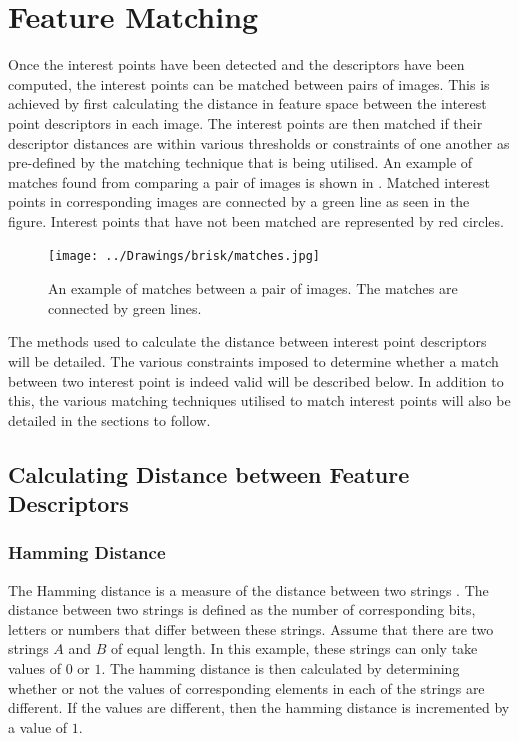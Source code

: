 \chapter{Feature Matching}
\label{sec:matching}
Once the interest points have been detected and the descriptors have been computed, the interest points can be matched between pairs of images. This is achieved by first calculating the distance in feature space between the interest point descriptors in each image. The interest points are then matched if their descriptor distances are within various thresholds or constraints of one another as pre-defined by the matching technique that is being utilised. An example of matches found from comparing a pair of images is shown in . Matched interest points in corresponding images are connected by a green line as seen in the figure. Interest points that have not been matched are represented by red circles.\\

\begin{figure}[h!] 
  \centering
    \texttt{[image: ../Drawings/brisk/matches.jpg]}
    \caption{An example of matches between a pair of images. The matches are connected by green lines.}
    \label{fig:matchesIntro}
\end{figure}

The methods used to calculate the distance between interest point descriptors will be detailed. The various constraints imposed to determine whether a match between two interest point is indeed valid will be described below. In addition to this, the various matching techniques utilised to match interest points will also be detailed in the sections to follow.\\

\section{Calculating Distance between Feature Descriptors}
\label{sec:distance}

\subsection{Hamming Distance}
\label{sec:hamming}
The Hamming distance is a measure of the distance between two strings \citep{Banzal2007}. The distance between two strings is defined as the number of corresponding bits, letters or numbers that differ between these strings. Assume that there are two strings $A$ and $B$ of equal length. In this example, these strings can only take values of $0$ or $1$. The hamming distance is then calculated by determining whether or not the values of corresponding elements in each of the strings are different. If the values are different, then the hamming distance is incremented by a value of $1$.\\


